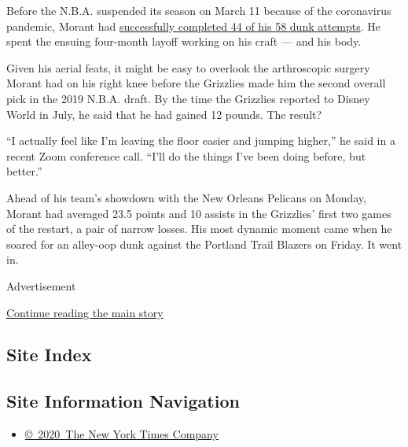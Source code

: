Before the N.B.A. suspended its season on March 11 because of the
coronavirus pandemic, Morant had
\href{https://stats.nba.com/player/1629630/shooting/}{successfully
completed 44 of his 58 dunk attempts}. He spent the ensuing four-month
layoff working on his craft --- and his body.

Given his aerial feats, it might be easy to overlook the arthroscopic
surgery Morant had on his right knee before the Grizzlies made him the
second overall pick in the 2019 N.B.A. draft. By the time the Grizzlies
reported to Disney World in July, he said that he had gained 12 pounds.
The result?

``I actually feel like I'm leaving the floor easier and jumping
higher,'' he said in a recent Zoom conference call. ``I'll do the things
I've been doing before, but better.''

Ahead of his team's showdown with the New Orleans Pelicans on Monday,
Morant had averaged 23.5 points and 10 assists in the Grizzlies' first
two games of the restart, a pair of narrow losses. His most dynamic
moment came when he soared for an alley-oop dunk against the Portland
Trail Blazers on Friday. It went in.

Advertisement

\protect\hyperlink{after-bottom}{Continue reading the main story}

\hypertarget{site-index}{%
\subsection{Site Index}\label{site-index}}

\hypertarget{site-information-navigation}{%
\subsection{Site Information
Navigation}\label{site-information-navigation}}

\begin{itemize}
\tightlist
\item
  \href{https://help.nytimes.com/hc/en-us/articles/115014792127-Copyright-notice}{©~2020~The
  New York Times Company}
\end{itemize}

